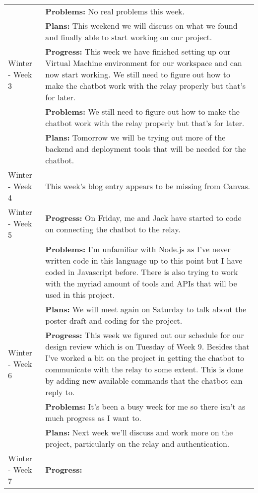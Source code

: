 \begin{longtable}[ht]{| p{1.5cm} | p{13.5cm} |}
     \\ & \textbf{Problems:}
     No real problems this week.
     \\ & \textbf{Plans:}
     This weekend we will discuss on what we found and finally able to start working on our project.
     \\
     \hline
     Winter - Week 3 &
     \textbf{Progress:}
     This week we have finished setting up our Virtual Machine environment for our workspace and can now start working. 
     We still need to figure out how to make the chatbot work with the relay properly but that's for later. 
     \\ & \textbf{Problems:}
     We still need to figure out how to make the chatbot work with the relay properly but that's for later.
     \\ & \textbf{Plans:}
     Tomorrow we will be trying out more of the backend and deployment tools that will be needed for the chatbot.
     \\
     \hline
     Winter - Week 4 &
     This week's blog entry appears to be missing from Canvas.\\
     \hline
     Winter - Week 5 &
     \textbf{Progress:}
     On Friday, me and Jack have started to code on connecting the chatbot to the relay.
     \\ & \textbf{Problems:}
     I'm unfamiliar with Node.js as I've never written code in this language up to this point but I have coded in Javascript before. 
     There is also trying to work with the myriad amount of tools and APIs that will be used in this project.
     \\ & \textbf{Plans:}
     We will meet again on Saturday to talk about the poster draft and coding for the project.\\
     \hline
     Winter - Week 6 &
     \textbf{Progress:}
     This week we figured out our schedule for our design review which is on Tuesday of Week 9. 
     Besides that I've worked a bit on the project in getting the chatbot to communicate with the relay to some extent. 
     This is done by adding new available commands that the chatbot can reply to.
     \\ & \textbf{Problems:}
     It's been a busy week for me so there isn't as much progress as I want to.
     \\ & \textbf{Plans:}
     Next week we'll discuss and work more on the project, particularly on the relay and authentication. 
     \\
     \hline
     Winter - Week 7 &
     \textbf{Progress:}

\end{longtable}
